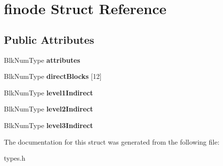 \hypertarget{structfinode}{}\section{finode Struct Reference}
\label{structfinode}
\subsection*{Public Attributes}
\begin{DoxyCompactItemize}
\item 
\mbox{\label{structfinode_acea49fb643c2e6a421d4d4ed674fe2c8}} 
Blk\+Num\+Type {\bfseries attributes}
\item 
\mbox{\label{structfinode_ad2e7c7bf4f5653afac46fb609f4a04bd}} 
Blk\+Num\+Type {\bfseries direct\+Blocks} \mbox{[}12\mbox{]}
\item 
\mbox{\label{structfinode_a0d707b42974c4777cd5ff71e3b70ed5a}} 
Blk\+Num\+Type {\bfseries level1\+Indirect}
\item 
\mbox{\label{structfinode_a758697bad925160db4e1e08b1d51550c}} 
Blk\+Num\+Type {\bfseries level2\+Indirect}
\item 
\mbox{\label{structfinode_a6c3fe6a69987a36fdfeae3acc8904edb}} 
Blk\+Num\+Type {\bfseries level3\+Indirect}
\end{DoxyCompactItemize}


The documentation for this struct was generated from the following file\+:\begin{DoxyCompactItemize}
\item 
types.\+h\end{DoxyCompactItemize}
